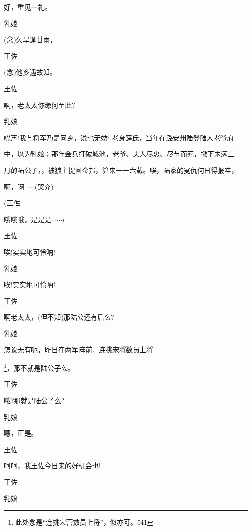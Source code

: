 {{{好，重见一礼。}

{乳娘\hspace{30pt}~

({\akai 念})久旱逢甘雨，}

{王佐\hspace{30pt}~

({\akai 念})他乡遇故知。}

{王佐\hspace{30pt}~

啊，老太太你缘何至此?}

{乳娘

噤声!我与将军乃是同乡，说也无妨: 老身薛氏，当年在潞安州陆登陆大老爷府

中，以为乳娘；那年金兵打破城池，老爷、夫人尽忠、尽节而死，撇下未满三

月的陆公子，，被狼主捉回金邦，算来一十六载。唉，陆家的冤仇何日得报哇，

啊，啊$\cdots{}\cdots{}$(哭介)}

{(王佐\hspace{30pt}~

哦哦哦，是是是$\cdots{}\cdots{}$)}

{王佐\hspace{30pt}~

唉!实实地可怜呐!}

{乳娘\hspace{30pt}~

唉!实实地可怜呐!}

{王佐\hspace{30pt}~

啊老太太，(但不知)那陆公还有后么?}

{乳娘

怎说无有呃，昨日在两军阵前，连挑宋将数员上将}\footnote{ 此处念是``连挑宋营数员上将''，似亦可。{541}}{，那不就是陆公子么。}

{王佐\hspace{30pt}~

哦?那就是陆公子么?}

{乳娘\hspace{30pt}~

嗯，正是。}

{王佐\hspace{30pt}~

呵呵，我王佐今日来的好机会也!}

{王佐

 }

{乳娘\hspace{30pt}~

}}}
